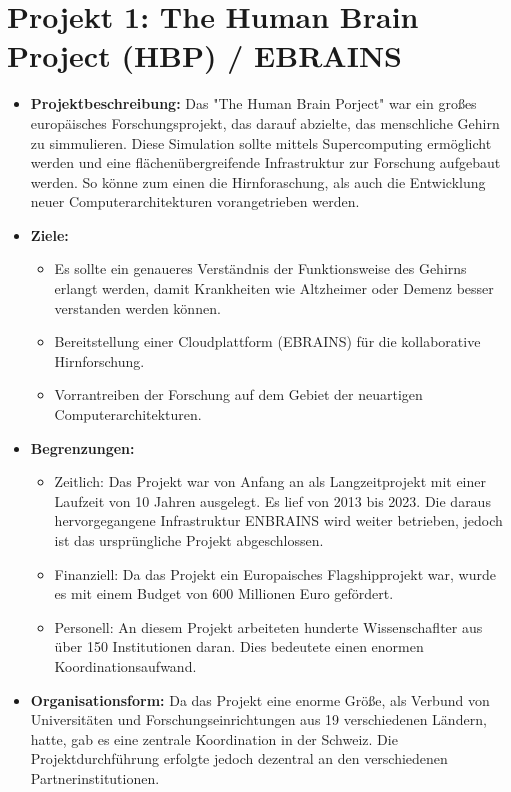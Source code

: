 \documentclass{article}
\begin{document}
\section{Projekt 1: The Human Brain Project (HBP) / EBRAINS}
\begin{itemize}
    \item \textbf{Projektbeschreibung:} 
    Das "The Human Brain Porject" war ein großes europäisches Forschungsprojekt, das darauf abzielte, 
    das menschliche Gehirn zu simmulieren. Diese Simulation sollte mittels Supercomputing ermöglicht 
    werden und eine flächenübergreifende Infrastruktur zur Forschung aufgebaut werden. 
    So könne zum einen die Hirnforaschung, als auch die Entwicklung neuer Computerarchitekturen 
    vorangetrieben werden.

    \item \textbf{Ziele:}
    \begin{itemize}
        \item Es sollte ein genaueres Verständnis der Funktionsweise des Gehirns erlangt 
        werden, damit Krankheiten wie Altzheimer oder Demenz besser verstanden werden können.
        \item Bereitstellung einer Cloudplattform (EBRAINS) für die kollaborative 
        Hirnforschung.
        \item Vorrantreiben der Forschung auf dem Gebiet der neuartigen Computerarchitekturen.
    \end{itemize}

    \item \textbf{Begrenzungen:}
    \begin{itemize}
        \item Zeitlich: Das Projekt war von Anfang an als Langzeitprojekt mit einer Laufzeit von 10 Jahren ausgelegt.
        Es lief von 2013 bis 2023. Die daraus hervorgegangene Infrastruktur ENBRAINS wird weiter betrieben, jedoch ist das ursprüngliche Projekt abgeschlossen.
        \item Finanziell: Da das Projekt ein Europaisches Flagshipprojekt war, wurde es mit einem Budget von 600 Millionen Euro gefördert.
        \item Personell: An diesem Projekt arbeiteten hunderte Wissenschaflter aus über 150 Institutionen daran. Dies bedeutete einen enormen Koordinationsaufwand.
    \end{itemize}

    \item \textbf{Organisationsform:}
    Da das Projekt eine enorme Größe, als Verbund von Universitäten und Forschungseinrichtungen aus 19 verschiedenen Ländern, hatte, gab es eine zentrale 
    Koordination in der Schweiz. Die Projektdurchführung erfolgte jedoch dezentral an den verschiedenen Partnerinstitutionen.
\end{itemize}
\end{document}
